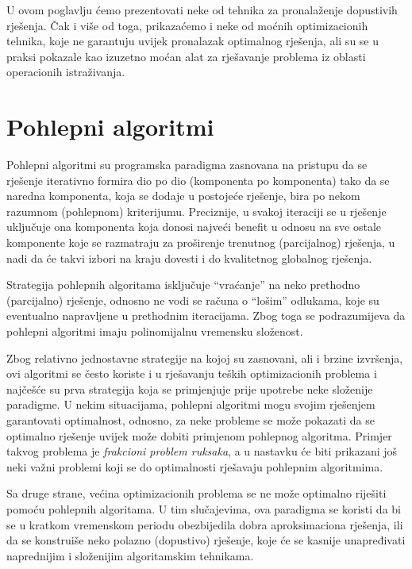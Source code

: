 \documentclass[a4paper, utf8, 11pt, colorlinks]{book}
\theoremstyle{definition}
\begin{document}
 U ovom poglavlju ćemo prezentovati neke od tehnika za pronalaženje dopustivih rješenja. Čak i više od toga, prikazaćemo i neke od moćnih optimizacionih tehnika, koje ne garantuju uvijek pronalazak optimalnog rješenja, ali su se u praksi pokazale kao izuzetno moćan alat za rješavanje problema iz oblasti operacionih istraživanja.
 

\section{Pohlepni algoritmi}
 
Pohlepni algoritmi su programska paradigma zasnovana na pristupu da se  rješenje iterativno formira dio po dio (komponenta po komponenta) tako da se naredna komponenta, koja se dodaje u postojeće rješenje, bira 
 po nekom razumnom (pohlepnom) kriterijumu. Preciznije, u svakoj iteraciji se u rješenje uključuje ona komponenta koja donosi najveći benefit u odnosu na sve ostale komponente koje se razmatraju za proširenje  trenutnog (parcijalnog) rješenja, u nadi da će takvi izbori na kraju dovesti i do kvalitetnog globalnog rješenja.
 
 
 Strategija pohlepnih algoritama isključuje ``vraćanje'' na neko prethodno (parcijalno) rješenje, odnosno ne vodi se računa o ``lošim'' odlukama, koje su eventualno napravljene u prethodnim iteracijama. Zbog toga se podrazumijeva da pohlepni algoritmi imaju polinomijalnu vremensku složenost.
 
 Zbog relativno jednostavne strategije na kojoj su zasnovani, ali i brzine izvršenja, ovi algoritmi se često koriste i u rješavanju teških optimizacionih problema i najčešće su prva strategija koja se primjenjuje prije 
upotrebe neke složenije paradigme. 
U nekim situacijama, pohlepni algoritmi mogu svojim rješenjem garantovati optimalnost, odnosno, za neke probleme se može pokazati da se optimalno rješenje uvijek može dobiti primjenom pohlepnog algoritma. Primjer takvog problema je \emph{frakcioni problem ruksaka}, a u nastavku će biti prikazani još neki važni problemi koji se do optimalnosti rješavaju pohlepnim algoritmima.
 
Sa druge strane, većina optimizacionih problema se ne može optimalno riješiti pomoću pohlepnih algoritama. U tim slučajevima, ova paradigma se koristi da bi se u kratkom vremenskom periodu obezbijedila dobra aproksimaciona rješenja, ili da se konstruiše neko polazno (dopustivo) rješenje, koje će se kasnije unapređivati naprednijim i složenijim algoritamskim tehnikama. 
\end{document}
